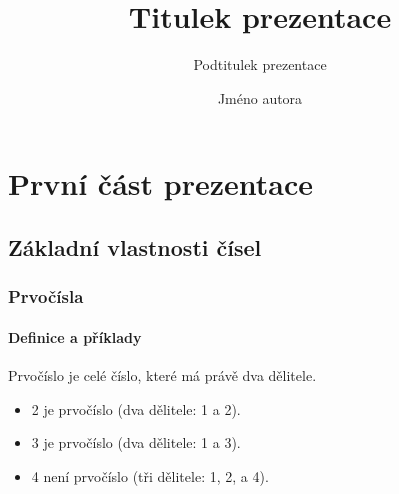 \documentclass{beamer}
\title{Titulek prezentace}
\subtitle{Podtitulek prezentace}
\author{Jméno autora}
\begin{document}
    \frame{\maketitle}
    \frame{\tableofcontents}

    \section{První část prezentace}
    \subsection{Základní vlastnosti čísel}
    \begin{frame}
        \frametitle{Prvočísla}
        \framesubtitle{Definice a příklady}
        
        \begin{definition}
            \alert{Prvočíslo} je celé číslo, které má právě dva dělitele.
        \end{definition}
        \begin{example}
            \begin{itemize}
                \item 2 je prvočíslo (dva dělitele: 1 a 2).
                \item 3 je prvočíslo (dva dělitele: 1 a 3).
                \item 4 není prvočíslo (\alert{tři} dělitele: 1, 2, a 4).
            \end{itemize}
        \end{example}
    \end{frame}
\end{document}
